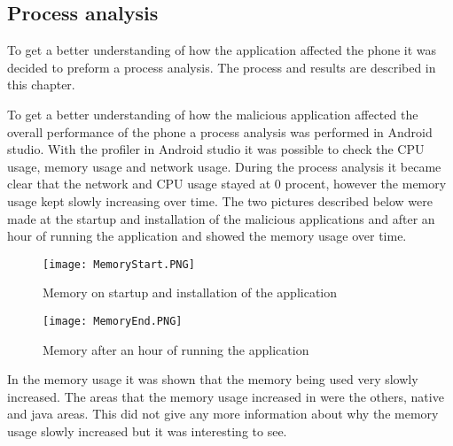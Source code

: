 \subsection{Process analysis}
To get a better understanding of how the application affected the phone it was decided to preform a process analysis. The process and results are described in this chapter. 

To get a better understanding of how the malicious application affected the overall performance of the phone a process analysis was performed in Android studio. With the profiler in Android studio it was possible to check the CPU usage, memory usage and network usage. During the process analysis it became clear that the network and CPU usage stayed at 0 procent, however the memory usage kept slowly increasing over time. The two pictures described below were made at the startup and installation of the malicious applications and after an hour of running the application and showed the memory usage over time. 

\begin{figure}[H]
    \centering
    \texttt{[image: MemoryStart.PNG]}
    \caption{Memory on startup and installation of the application}
    \label{jordy-memorystartup}
\end{figure}

\begin{figure}[H]
    \centering
    \texttt{[image: MemoryEnd.PNG]}
    \caption{Memory after an hour of running the application}
    \label{jordy-memory1hour}
\end{figure}

In the memory usage it was shown that the memory being used very slowly increased. The areas that the memory usage increased in were the others, native and java areas. This did not give any more information about why the memory usage slowly increased but it was interesting to see.